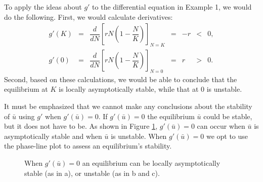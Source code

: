 \documentclass[../book.tex]{subfiles}
\begin{document}
To apply the ideas about \(g'\) to the differential equation in Example 1, we would do the following. First, we would calculate derivatives:
\begin{equation}\label{eq:inexact-2}
\begin{array}{ccccrcl}
  g'(K) &=& \dfrac{d}{dN} \left[ rN \left(1-\dfrac{N}{K}\right) \right]_{N=K} &=& -r & < & 0, \\
  g'(0) &=& \dfrac{d}{dN} \left[ rN \left(1-\dfrac{N}{K}\right) \right]_{N=0} &=&  r & > & 0.
\end{array}
\end{equation}
Second, based on these calculations, we would be able to conclude that the equilibrium at \(K\) is locally asymptotically stable, while that at \(0\) is unstable.

It must be emphasized that we cannot make any conclusions about the stability of \(\bar u\) using \(g'\) when \(g'(\bar u) = 0\). If \(g'(\bar u) = 0\) the equilibrium \(\bar u\) could be stable, but it does not have to be. As shown in Figure \ref{fig:phase2}, \(g'(\bar u) =0\) can occur when \(\bar u\) is asymptotically stable and when \(\bar u\) is unstable. When \(g'(\bar u)=0\) we opt to use the phase-line plot to assess an equilibrium's stability.

\begin{figure}[htbp]
  \centering
  \hspace{0.25in}
  \hspace{0.25in}
  \caption{When \(g'(\bar u) =0\) an equilibrium can be locally asymptotically stable (as in a), or unstable (as in b and c).}
  \label{fig:phase2}
\end{figure}
\end{document}
